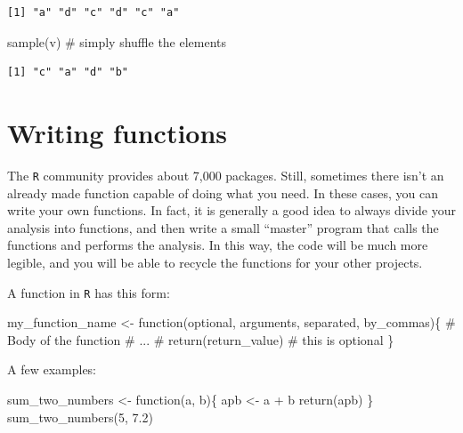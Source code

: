 \documentclass[
  letterpaper,
  DIV=11,
  numbers=noendperiod]{scrreprt}
\newenvironment{Shaded}{\begin{snugshade}}{\end{snugshade}}
\newcommand{\CommentTok}[1]{\textcolor[rgb]{0.37,0.37,0.37}{#1}}
\newcommand{\ControlFlowTok}[1]{\textcolor[rgb]{0.00,0.23,0.31}{#1}}
\newcommand{\DecValTok}[1]{\textcolor[rgb]{0.68,0.00,0.00}{#1}}
\newcommand{\FloatTok}[1]{\textcolor[rgb]{0.68,0.00,0.00}{#1}}
\newcommand{\FunctionTok}[1]{\textcolor[rgb]{0.28,0.35,0.67}{#1}}
\newcommand{\NormalTok}[1]{\textcolor[rgb]{0.00,0.23,0.31}{#1}}
\newcommand{\OtherTok}[1]{\textcolor[rgb]{0.00,0.23,0.31}{#1}}
\newcommand{\SpecialCharTok}[1]{\textcolor[rgb]{0.37,0.37,0.37}{#1}}
\begin{document}
\begin{verbatim}
[1] "a" "d" "c" "d" "c" "a"
\end{verbatim}

\begin{Shaded}
\begin{Highlighting}[]
\FunctionTok{sample}\NormalTok{(v) }\CommentTok{\# simply shuffle the elements}
\end{Highlighting}
\end{Shaded}

\begin{verbatim}
[1] "c" "a" "d" "b"
\end{verbatim}

\hypertarget{writing-functions}{%
\section{Writing functions}\label{writing-functions}}

The \texttt{R} community provides about 7,000 packages. Still, sometimes
there isn't an already made function capable of doing what you need. In
these cases, you can write your own functions. In fact, it is generally
a good idea to always divide your analysis into functions, and then
write a small ``master'' program that calls the functions and performs
the analysis. In this way, the code will be much more legible, and you
will be able to recycle the functions for your other projects.

A function in \texttt{R} has this form:

\begin{Shaded}
\begin{Highlighting}[]
\NormalTok{my\_function\_name }\OtherTok{\textless{}{-}} \ControlFlowTok{function}\NormalTok{(optional, arguments, separated, by\_commas)\{}
  \CommentTok{\# Body of the function}
  \CommentTok{\# ...}
  \CommentTok{\# }
  \FunctionTok{return}\NormalTok{(return\_value) }\CommentTok{\# this is optional}
\NormalTok{\}}
\end{Highlighting}
\end{Shaded}

A few examples:

\begin{Shaded}
\begin{Highlighting}[]
\NormalTok{sum\_two\_numbers }\OtherTok{\textless{}{-}} \ControlFlowTok{function}\NormalTok{(a, b)\{}
\NormalTok{  apb }\OtherTok{\textless{}{-}}\NormalTok{ a }\SpecialCharTok{+}\NormalTok{ b  }
  \FunctionTok{return}\NormalTok{(apb)}
\NormalTok{\}}
\FunctionTok{sum\_two\_numbers}\NormalTok{(}\DecValTok{5}\NormalTok{, }\FloatTok{7.2}\NormalTok{)}
\end{Highlighting}
\end{Shaded}
\end{document}
